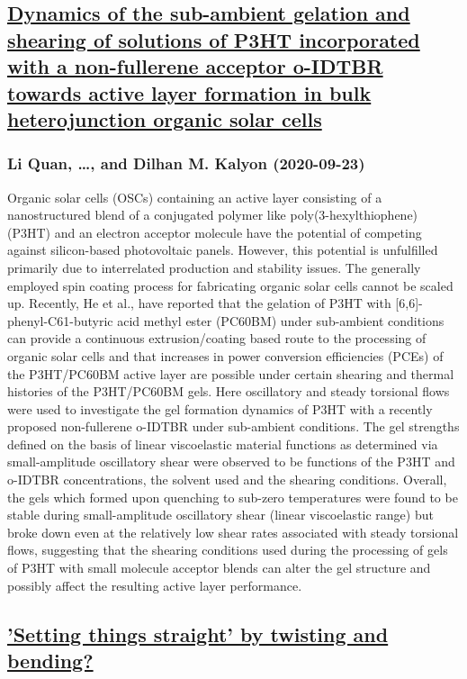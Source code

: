 \subsection*{\href{http://arxiv.org/abs/2009.11411v1}{Dynamics of the sub-ambient gelation and shearing of solutions of P3HT  incorporated with a non-fullerene acceptor o-IDTBR towards active layer  formation in bulk heterojunction organic solar cells}}
\subsubsection*{Li Quan, \dots, and Dilhan M. Kalyon (2020-09-23)}
Organic solar cells (OSCs) containing an active layer consisting of a
nanostructured blend of a conjugated polymer like poly(3-hexylthiophene) (P3HT)
and an electron acceptor molecule have the potential of competing against
silicon-based photovoltaic panels. However, this potential is unfulfilled
primarily due to interrelated production and stability issues. The generally
employed spin coating process for fabricating organic solar cells cannot be
scaled up. Recently, He et al., have reported that the gelation of P3HT with
[6,6]-phenyl-C61-butyric acid methyl ester (PC60BM) under sub-ambient
conditions can provide a continuous extrusion/coating based route to the
processing of organic solar cells and that increases in power conversion
efficiencies (PCEs) of the P3HT/PC60BM active layer are possible under certain
shearing and thermal histories of the P3HT/PC60BM gels. Here oscillatory and
steady torsional flows were used to investigate the gel formation dynamics of
P3HT with a recently proposed non-fullerene o-IDTBR under sub-ambient
conditions. The gel strengths defined on the basis of linear viscoelastic
material functions as determined via small-amplitude oscillatory shear were
observed to be functions of the P3HT and o-IDTBR concentrations, the solvent
used and the shearing conditions. Overall, the gels which formed upon quenching
to sub-zero temperatures were found to be stable during small-amplitude
oscillatory shear (linear viscoelastic range) but broke down even at the
relatively low shear rates associated with steady torsional flows, suggesting
that the shearing conditions used during the processing of gels of P3HT with
small molecule acceptor blends can alter the gel structure and possibly affect
the resulting active layer performance.

\subsection*{\href{http://arxiv.org/abs/2009.11399v1}{'Setting things straight' by twisting and bending?}}
